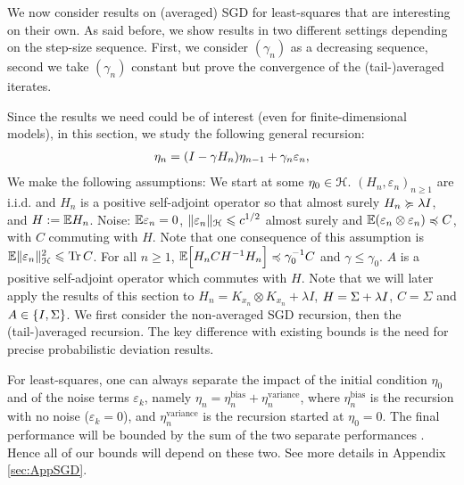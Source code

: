 
We now consider results on (averaged) SGD for least-squares that are interesting on their own. As said before, we show  results in two different settings depending on the step-size sequence. First,  we consider $(\gamma_n)$ as a decreasing sequence, second we take $(\gamma_n)$ constant but prove the convergence of the (tail-)averaged iterates.

Since the results we need could be of interest (even for finite-dimensional models), in this section, we study the following general recursion:
\begin{align}
\label{eq:SGDabstract}
\eta_n = ( I - \gamma H_n) \eta_{n-1} + \gamma_n \varepsilon_n,
\end{align}
%
We make the following assumptions:  
\vspace{-0.2cm}
%
\basgd \label{asm:init}  We start at some $\eta_0 \in {\mathcal H}$. \easgd
\vspace{-0.65cm}
\basgd \label{asm:noise-iid}   $(H_n,\varepsilon_n)_{n \geqslant 1} $ are  i.i.d. and $H_n$ is a positive self-adjoint operator so that almost surely $H_n \succcurlyeq \lambda I$, and $H  := {\mathbb E} H_n$. \easgd
\vspace{-0.5cm}
\basgd \label{asm:noise-bound}  Noise: $ {\mathbb E}  \varepsilon_n   = 0$, $\| \varepsilon_n  \|_{\mathcal H} \leqslant c^{1/2} $ almost surely and ${\mathbb E}  ( \varepsilon_n   \otimes \varepsilon_n ) \preccurlyeq C$, with $C$ commuting with $H$. Note that one consequence of this assumption is ${\mathbb E} \|\varepsilon_n\|_{\mathcal H}^2 \leqslant \operatorname{Tr} C$. \easgd
\vspace{-0.5cm}
\basgd \label{asm:weird-bound}  For all $n \geqslant 1$, ${\mathbb E} \Big[  H_n C H^{-1} H_n \Big] \preccurlyeq \gamma_0^{-1} C$ and $\gamma \leqslant \gamma_0$. \easgd
\vspace{-0.5cm}
\basgd \label{asm:commute}  $A$ is a positive self-adjoint operator which commutes with $H$. \easgd
%
Note that we will later apply the results of this section to $H_n =  K_{x_n} \otimes K_{x_n} + \lambda I$, $H = \Sigma + \lambda I$, $C = \Sigma$ and $A \in \{I, \Sigma\}$. We first consider the non-averaged SGD recursion, then the (tail-)averaged recursion. The key difference with existing bounds is the need for precise probabilistic deviation results.


For least-squares, one can always separate the impact of the initial condition $\eta_0$ and of the noise terms $\varepsilon_k$, namely $\eta_n = \eta_n^{\textrm {bias}} + \eta_n^{\textrm {variance}}$, where $\eta_n^{\textrm {bias}}$ is the recursion with no noise ($\varepsilon_k = 0$), and $\eta_{n}^{\textrm {variance}}$ is the recursion started at $\eta_0=0$. The final performance will be bounded by the sum of the two separate performances \citep[see, e.g.,][]{defossez2014constant}. Hence all of our bounds will depend on these two. See more details in Appendix \ref{sec:AppSGD}.


